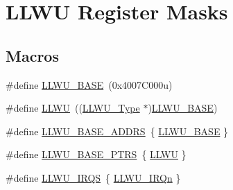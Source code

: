 \hypertarget{group___l_l_w_u___register___masks}{}\section{L\+L\+WU Register Masks}
\label{group___l_l_w_u___register___masks}
\subsection*{Macros}
\begin{DoxyCompactItemize}
\item 
\#define \mbox{\hyperlink{group___l_l_w_u___register___masks_ga5596067d46debe317ac368bfc5db21f8}{L\+L\+W\+U\+\_\+\+B\+A\+SE}}~(0x4007\+C000u)
\item 
\#define \mbox{\hyperlink{group___l_l_w_u___register___masks_gaed2d6ced03dff7739533096e53983dbe}{L\+L\+WU}}~((\mbox{\hyperlink{struct_l_l_w_u___type}{L\+L\+W\+U\+\_\+\+Type}} $\ast$)\mbox{\hyperlink{group___l_l_w_u___register___masks_ga5596067d46debe317ac368bfc5db21f8}{L\+L\+W\+U\+\_\+\+B\+A\+SE}})
\item 
\#define \mbox{\hyperlink{group___l_l_w_u___register___masks_ga3d947ff94f2db32873659ceeeb8bc767}{L\+L\+W\+U\+\_\+\+B\+A\+S\+E\+\_\+\+A\+D\+D\+RS}}~\{ \mbox{\hyperlink{group___l_l_w_u___register___masks_ga5596067d46debe317ac368bfc5db21f8}{L\+L\+W\+U\+\_\+\+B\+A\+SE}} \}
\item 
\#define \mbox{\hyperlink{group___l_l_w_u___register___masks_ga4826d688973513cc02a2f1d4f67c336b}{L\+L\+W\+U\+\_\+\+B\+A\+S\+E\+\_\+\+P\+T\+RS}}~\{ \mbox{\hyperlink{group___l_l_w_u___register___masks_gaed2d6ced03dff7739533096e53983dbe}{L\+L\+WU}} \}
\item 
\#define \mbox{\hyperlink{group___l_l_w_u___register___masks_ga00f85a14dffe324ff8e867f8b06f1461}{L\+L\+W\+U\+\_\+\+I\+R\+QS}}~\{ \mbox{\hyperlink{group___interrupt__vector__numbers_gga666eb0caeb12ec0e281415592ae89083a8b7bac6898a42e6dadf89d7c8b07baaa}{L\+L\+W\+U\+\_\+\+I\+R\+Qn}} \}
\end{DoxyCompactItemize}
